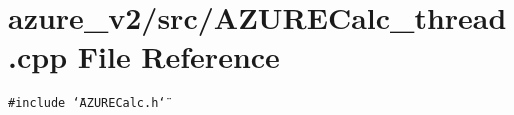 \section{azure\_\-v2/src/AZURECalc\_\-thread.cpp File Reference}
\label{AZURECalc__thread_8cpp}
{\tt \#include \char`\"{}AZURECalc.h\char`\"{}}\par
